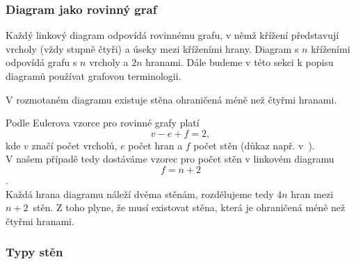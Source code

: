 \subsubsection{Diagram jako rovinný graf} \label{jakograf}
Každý linkový diagram odpovídá rovinnému grafu, v němž křížení představují vrcholy (vždy stupně čtyři) a úseky mezi kříženími hrany. Diagram s $n$ kříženími odpovídá grafu s $n$ vrcholy a $2n$ hranami.
Dále budeme v této sekci k popisu diagramů používat grafovou terminologii. 

\begin{lemma}
V rozmotaném diagramu existuje stěna ohraničená méně než čtyřmi hranami.
\end{lemma}

\begin{dukaz}
Podle Eulerova vzorce pro rovinné grafy platí $$v - e +f = 2,$$ kde $v$ značí počet vrcholů, $e$ počet hran a $f$ počet stěn (důkaz např. v~\cite{kapitoly}).
\\
V našem případě tedy dostáváme vzorec pro počet stěn v linkovém diagramu $$f = n+2$$.
\\
Každá hrana diagramu náleží dvěma stěnám, rozdělujeme tedy $4n$ hran mezi $n+2$~stěn. Z toho plyne, že musí existovat stěna, která je ohraničená méně než čtyřmi hranami. 
\end{dukaz} 

\subsubsection{Typy stěn} \label{steny}

